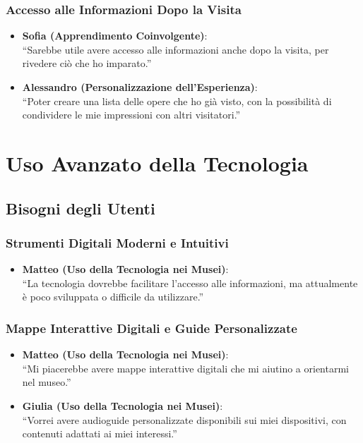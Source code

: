 \documentclass{article}
\begin{document}
\subsubsection{Accesso alle Informazioni Dopo la Visita}

\begin{itemize}
    \item \textbf{Sofia (Apprendimento Coinvolgente)}:\\
    ``Sarebbe utile avere accesso alle informazioni anche dopo la visita, per rivedere ciò che ho imparato.''
    \item \textbf{Alessandro (Personalizzazione dell'Esperienza)}:\\
    ``Poter creare una lista delle opere che ho già visto, con la possibilità di condividere le mie impressioni con altri visitatori.''
\end{itemize}

\section{Uso Avanzato della Tecnologia}

\subsection{Bisogni degli Utenti}

\subsubsection{Strumenti Digitali Moderni e Intuitivi}

\begin{itemize}
    \item \textbf{Matteo (Uso della Tecnologia nei Musei)}:\\
    ``La tecnologia dovrebbe facilitare l'accesso alle informazioni, ma attualmente è poco sviluppata o difficile da utilizzare.''
\end{itemize}

\subsubsection{Mappe Interattive Digitali e Guide Personalizzate}

\begin{itemize}
    \item \textbf{Matteo (Uso della Tecnologia nei Musei)}:\\
    ``Mi piacerebbe avere mappe interattive digitali che mi aiutino a orientarmi nel museo.''
    \item \textbf{Giulia (Uso della Tecnologia nei Musei)}:\\
    ``Vorrei avere audioguide personalizzate disponibili sui miei dispositivi, con contenuti adattati ai miei interessi.''
\end{itemize}
\end{document}
